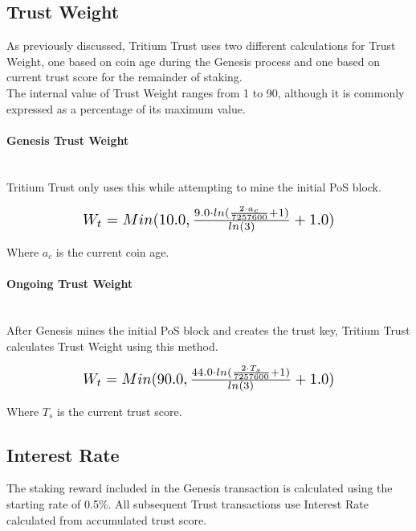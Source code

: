 \documentclass[11pt]{article}
\begin{document}
\subsection{Trust Weight}
\noindent As previously discussed, Tritium Trust uses two different calculations for Trust Weight, one based on coin age during the Genesis process and one based on current trust score for the remainder of staking.\\

\noindent The internal value of Trust Weight ranges from 1 to 90, although it is commonly expressed as a percentage of its maximum value.\\

\paragraph{Genesis Trust Weight} ~\\
Tritium Trust only uses this while attempting to mine the initial PoS block.

\begin{equation}
\resizebox{.65\hsize}{!}{$W_{t} = Min(10.0, \frac{9.0 \cdot ln(\frac{2 \cdot a_c}{7257600} + 1)}{ln(3)} + 1.0)$}
\end{equation}

\noindent Where $a_c$ is the current coin age.\\

\paragraph{Ongoing Trust Weight} ~\\
After Genesis mines the initial PoS block and creates the trust key, Tritium Trust calculates Trust Weight using this method.
 
\begin{equation}
\resizebox{.65\hsize}{!}{$W_{t} = Min(90.0, \frac{44.0 \cdot ln(\frac{2 \cdot T_{s}}{7257600} + 1)}{ln(3)} + 1.0)$}
\end{equation}

\noindent Where $T_{s}$ is the current trust score.\\


\subsection{Interest Rate}
\noindent The staking reward included in the Genesis transaction is calculated using the starting rate of 0.5\%. All subsequent Trust transactions use Interest Rate calculated from accumulated trust score.\\
 
\end{document}

